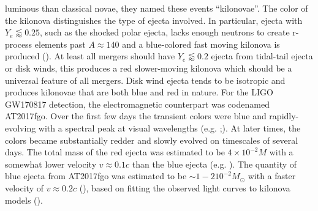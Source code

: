 luminous than classical novae, they named these events “kilonovae”.  The color of the kilonova distinguishes the type of ejecta involved. In particular, ejecta with $Y_e \lessapprox 0.25$, such as the shocked polar ejecta, lacks enough neutrons to create r-process elements past $A \approx 140$ and a blue-colored fast moving kilonova is produced (\cite{metzger2014}). At least all mergers should have $Y_e \lessapprox 0.2$ ejecta from tidal-tail ejecta or disk winds, this produces a red slower-moving kilonova which should be a universal feature of all mergers. Disk wind ejecta tends to be isotropic and produces kilonovae that are both blue and red in nature. For the LIGO GW170817 detection, the  electromagnetic counterpart was codenamed AT2017fgo. Over the first few days the transient colors were blue and rapidly-evolving with a spectral peak at visual wavelengths (e.g. \cite{2017apj...848l..16s,2017apj...848l..16s,2017apj...848l..18n,2017apj...848l..18n,2017apj...848l..32m,cowperthwaite:2017dyu};). At later times, the colors became substantially redder and slowly evolved on timescales of several days. The total mass of the red ejecta was estimated to be $4 × 10^{-2} M$ with a somewhat lower velocity $v \approx 0.1 c$ than the blue ejecta (e.g. \cite{cowperthwaite:2017dyu,2017apj...848l..19c,2017apj...848l..18n}). The quantity of blue ejecta from AT2017fgo was estimated to be $\sim 1-2 10^{-2}M_\odot$
with a faster velocity of $v \approx 0.2 c$ (\cite{cowperthwaite:2017dyu,2017apj...848l..18n}), based on fitting the observed light curves to kilonova models (\cite{metzger2017}). 


